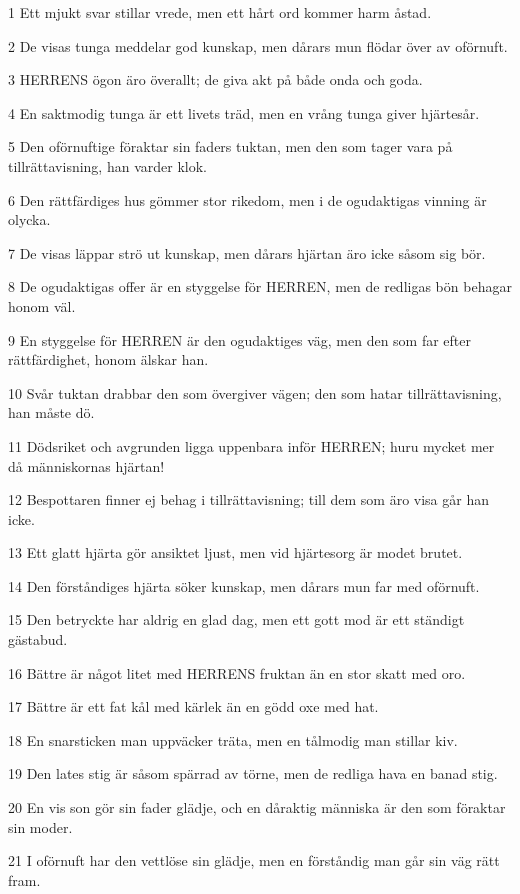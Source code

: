 \par 1 Ett mjukt svar stillar vrede, men ett hårt ord kommer harm åstad.
\par 2 De visas tunga meddelar god kunskap, men dårars mun flödar över av oförnuft.
\par 3 HERRENS ögon äro överallt; de giva akt på både onda och goda.
\par 4 En saktmodig tunga är ett livets träd, men en vrång tunga giver hjärtesår.
\par 5 Den oförnuftige föraktar sin faders tuktan, men den som tager vara på tillrättavisning, han varder klok.
\par 6 Den rättfärdiges hus gömmer stor rikedom, men i de ogudaktigas vinning är olycka.
\par 7 De visas läppar strö ut kunskap, men dårars hjärtan äro icke såsom sig bör.
\par 8 De ogudaktigas offer är en styggelse för HERREN, men de redligas bön behagar honom väl.
\par 9 En styggelse för HERREN är den ogudaktiges väg, men den som far efter rättfärdighet, honom älskar han.
\par 10 Svår tuktan drabbar den som övergiver vägen; den som hatar tillrättavisning, han måste dö.
\par 11 Dödsriket och avgrunden ligga uppenbara inför HERREN; huru mycket mer då människornas hjärtan!
\par 12 Bespottaren finner ej behag i tillrättavisning; till dem som äro visa går han icke.
\par 13 Ett glatt hjärta gör ansiktet ljust, men vid hjärtesorg är modet brutet.
\par 14 Den förståndiges hjärta söker kunskap, men dårars mun far med oförnuft.
\par 15 Den betryckte har aldrig en glad dag, men ett gott mod är ett ständigt gästabud.
\par 16 Bättre är något litet med HERRENS fruktan än en stor skatt med oro.
\par 17 Bättre är ett fat kål med kärlek än en gödd oxe med hat.
\par 18 En snarsticken man uppväcker träta, men en tålmodig man stillar kiv.
\par 19 Den lates stig är såsom spärrad av törne, men de redliga hava en banad stig.
\par 20 En vis son gör sin fader glädje, och en dåraktig människa är den som föraktar sin moder.
\par 21 I oförnuft har den vettlöse sin glädje, men en förståndig man går sin väg rätt fram.
